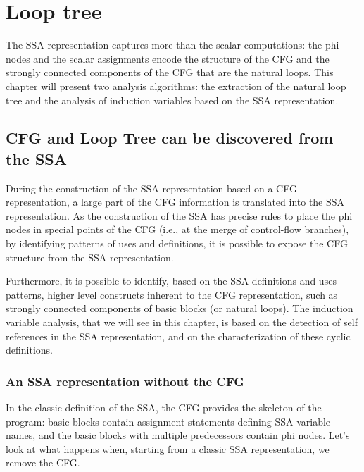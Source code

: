 \chapter{Loop tree }

\providecommand{\SSA}{SSA}
\providecommand{\CFG}{CFG}
\providecommand{\loopphi}{loop-$\phi$}
\providecommand{\closephi}{close-$\phi$}
\providecommand{\CHREC}[1]{\{#1\}}

The \SSA{} representation captures more than the scalar computations: the
phi nodes and the scalar assignments encode the structure of the CFG
and the strongly connected components of the CFG that are the natural
loops.  This chapter will present two analysis algorithms: the
extraction of the natural loop tree and the analysis of induction
variables based on the \SSA{} representation.

\section{\CFG{} and Loop Tree can be discovered from the \SSA{}}

During the construction of the \SSA{} representation based on a \CFG{}
representation, a large part of the \CFG{} information is translated
into the \SSA{} representation.  As the construction of the \SSA{} has
precise rules to place the phi nodes in special points of the \CFG{}
(i.e., at the merge of control-flow branches), by identifying patterns
of uses and definitions, it is possible to expose the \CFG{} structure
from the \SSA{} representation.

Furthermore, it is possible to identify, based on the \SSA{}
definitions and uses patterns, higher level constructs inherent to the
\CFG{} representation, such as strongly connected components of basic
blocks (or natural loops).  The induction variable analysis, that we
will see in this chapter, is based on the detection of self references
in the \SSA{} representation, and on the characterization of these
cyclic definitions.

\subsection{An \SSA{} representation without the \CFG{}}

In the classic definition of the \SSA{}, the \CFG{} provides the
skeleton of the program: basic blocks contain assignment statements
defining \SSA{} variable names, and the basic blocks with multiple
predecessors contain phi nodes.  Let's look at what happens when,
starting from a classic \SSA{} representation, we remove the \CFG{}.

